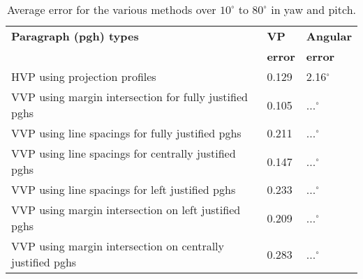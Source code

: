 \begin{table}[t]
  \begin{center}
    \begin{tabular}{|p{95mm}|l|l|}
      \hline
      {\bf Paragraph (pgh) types } & {\bf VP} & {\bf Angular} \\
      {\bf } & {\bf error} & {\bf error} \\  \hline \hline
      HVP using projection profiles & 0.129 & 2.16$^\circ$ \\  \hline
      VVP using margin intersection for fully justified pghs & 0.105 & ...$^\circ$ \\ \hline
      VVP using line spacings for fully justified pghs & 0.211 & ...$^\circ$ \\ \hline
      VVP using line spacings for centrally justified pghs & 0.147 & ...$^\circ$ \\ \hline
      VVP using line spacings for left justified pghs & 0.233 & ...$^\circ$ \\ \hline
      VVP using margin intersection on left justified pghs & 0.209 & ...$^\circ$ \\   \hline
      VVP using margin intersection on centrally justified pghs & 0.283 & ...$^\circ$ \\ \hline  \hline
   \end{tabular}
  \end{center}
  \caption{Average error for the various methods over $10^\circ$ to $80^{\circ}$ in yaw and pitch.}
  \label{accuracytable}
\end{table}


